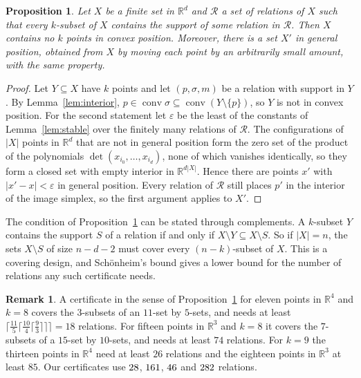 \documentclass[aps,prd,twocolumn,superscriptaddress,nofootinbib,longbibliography,floatfix,showkeys,amsmath,amssymb,10pt]{revtex4-2}
\theoremstyle{plain}
\newtheorem{proposition}[theorem]{Proposition}
\theoremstyle{definition}
\newtheorem{remark}[theorem]{Remark}
\theoremstyle{plain}
\newcommand{\R}{\mathbb{R}}
\newcommand{\conv}{\operatorname{conv}}
\begin{document}
\begin{proposition}\label{prop:cover}
Let $X$ be a finite set in $\R^d$ and $\mathcal{R}$ a set of relations of $X$ such that every $k$-subset of $X$ contains the support of some relation in $\mathcal{R}$. Then $X$ contains no $k$ points in convex position. Moreover, there is a set $X'$ in general position, obtained from $X$ by moving each point by an arbitrarily small amount, with the same property.
\end{proposition}

\begin{proof}
Let $Y\subseteq X$ have $k$ points and let $(p,\sigma,m)$ be a relation with support in $Y$. By Lemma~\ref{lem:interior}, $p\in\conv\sigma\subseteq\conv(Y\setminus\{p\})$, so $Y$ is not in convex position. For the second statement let $\varepsilon$ be the least of the constants of Lemma~\ref{lem:stable} over the finitely many relations of $\mathcal R$. The configurations of $|X|$ points in $\R^d$ that are not in general position form the zero set of the product of the polynomials $\det(x_{i_0},\dots,x_{i_d})$, none of which vanishes identically, so they form a closed set with empty interior in $\R^{d|X|}$. Hence there are points $x'$ with $|x'-x|<\varepsilon$ in general position. Every relation of $\mathcal R$ still places $p'$ in the interior of the image simplex, so the first argument applies to $X'$.
\end{proof}

The condition of Proposition~\ref{prop:cover} can be stated through complements. A $k$-subset $Y$ contains the support $S$ of a relation if and only if $X\setminus Y\subseteq X\setminus S$. So if $|X|=n$, the sets $X\setminus S$ of size $n-d-2$ must cover every $(n-k)$-subset of $X$. This is a covering design, and Sch\"onheim's bound \cite{Sch64} gives a lower bound for the number of relations any such certificate needs.

\begin{remark}\label{rem:schoenheim}
A certificate in the sense of Proposition~\ref{prop:cover} for eleven points in $\R^4$ and $k=8$ covers the $3$-subsets of an $11$-set by $5$-sets, and needs at least $\lceil\frac{11}{5}\lceil\frac{10}{4}\lceil\frac{9}{3}\rceil\rceil\rceil=18$ relations. For fifteen points in $\R^3$ and $k=8$ it covers the $7$-subsets of a $15$-set by $10$-sets, and needs at least $74$ relations. For $k=9$ the thirteen points in $\R^4$ need at least $26$ relations and the eighteen points in $\R^3$ at least $85$. Our certificates use $28$, $161$, $46$ and $282$ relations.
\end{remark}
\end{document}
